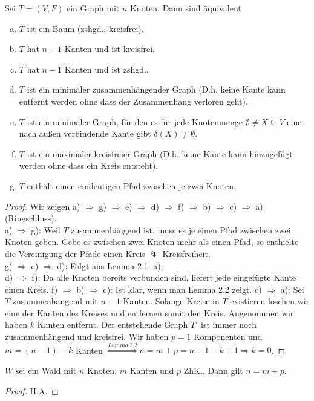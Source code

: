 \begin{satz}
	Sei $T=(V,F)$ ein Graph mit $n$ Knoten. Dann sind äquivalent
	\begin{enumerate}[a)]
		\item $T$ ist ein Baum (zshgd., kreisfrei).
		\item $T$ hat $n-1$ Kanten und ist kreisfrei.
		\item $T$ hat $n-1$ Kanten und ist zshgd..
		\item $T$ ist ein minimaler zusammenhängender Graph (D.h. keine Kante kann entfernt werden ohne dass der Zusammenhang verloren geht).
		\item $T$ ist ein minimaler Graph, für den es für jede Knotenmenge $\emptyset \neq X\subseteq V$ eine nach außen verbindende Kante gibt $\delta(X) \neq \emptyset$.
		\item $T$ ist ein maximaler kreisfreier Graph (D.h. keine Kante kann hinzugefügt werden ohne dass ein Kreis entsteht).
		\item $T$ enthält einen eindeutigen Pfad zwischen je zwei Knoten.
	\end{enumerate}
\end{satz}
\begin{proof}
	Wir zeigen a) $\Rightarrow$ g) $\Rightarrow$ e) $\Rightarrow$ d) $\Rightarrow$ f) $\Rightarrow$ b) $\Rightarrow$ c) $\Rightarrow$ a) (Ringschluss).\\
	a) $\Rightarrow$ g): Weil $T$ zusammenhängend ist, muss es je einen Pfad zwischen zwei Knoten geben. Gebe es zwischen zwei Knoten mehr als einen Pfad, so enthielte die Vereinigung der Pfade einen Kreis $\lightning$ Kreisfreiheit.\\
	g) $\Rightarrow$ e) $\Rightarrow$ d): Folgt aus Lemma 2.1. a).\\
	d) $\Rightarrow$ f): Da alle Knoten bereits verbunden sind, liefert jede eingefügte Kante einen Kreis.
	f) $\Rightarrow$ b) $\Rightarrow$ c): Ist klar, wenn man Lemma 2.2 zeigt.
	c) $\Rightarrow$ a): Sei $T$ zusammenhängend mit $n-1$ Kanten. Solange Kreise in $T$ existieren löschen wir eine der Kanten des Kreises und entfernen somit den Kreis. Angenommen wir haben $k$ Kanten entfernt. Der entstehende Graph $T'$ ist immer noch zusammenhängend und kreisfrei. Wir haben $p=1$ Komponenten und $m=(n-1)-k$ Kanten $\overset{Lemma~2.2}{\Rightarrow} n =m+p=n-1-k+1 \Rightarrow k=0$. 
\end{proof}
\begin{lemma}
	$W$ sei ein Wald mit $n$ Knoten, $m$ Kanten und $p$ ZhK.. Dann gilt $n=m+p$.
\end{lemma}
\begin{proof}
	H.A.
\end{proof}
